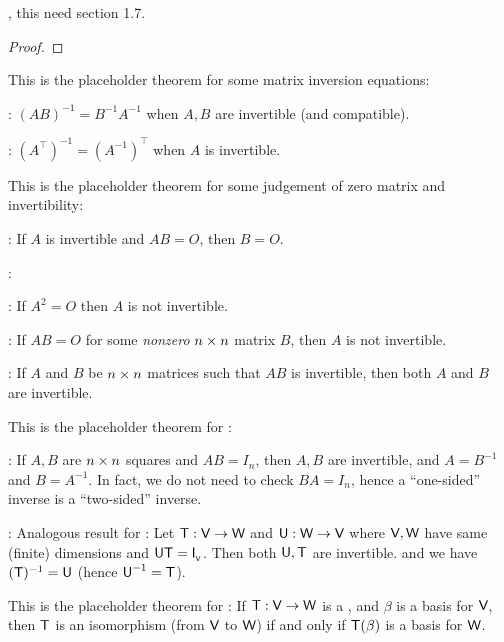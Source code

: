 \begin{exercise} \label{exercise 2.4.25}
\TODOREF{} , this need section 1.7.
\end{exercise}

\begin{proof}
\end{proof}

\begin{additional theorem} \label{athm 2.36}
This is the placeholder theorem for some matrix inversion equations:

 : \((AB)^{-1} = B^{-1} A^{-1}\) when \(A, B\) are invertible (and compatible).

 : \((A^\top)^{-1} = (A^{-1})^\top\) when \(A\) is invertible.
\end{additional theorem}

\begin{additional theorem} \label{athm 2.37}
This is the placeholder theorem for some judgement of zero matrix and invertibility:

 : If \(A\) is invertible and \(AB = O\), then \(B = O\).

:

: If \(A^2 = O\) then \(A\) is not invertible.

: If \(AB = O\) for some \emph{nonzero} \(n \times n\) matrix \(B\), then \(A\) is not invertible.

 : If \(A\) and \(B\) be \(n \times n\) matrices such that \(AB\) is invertible, then both \(A\) and \(B\) are invertible.
\end{additional theorem}

\begin{additional theorem} \label{athm 2.38}
This is the placeholder theorem for :

: If \(A, B\) are \(n \times n\) squares and \(AB = I_n\), then \(A, B\) are invertible, and \(A = B^{-1}\) and \(B = A^{-1}\).
In fact, we do not need to check \(BA = I_n\), hence a ``one-sided'' inverse is a ``two-sided'' inverse.

: Analogous result for \LTRAN{}:
Let \(\textsf{T} : \textsf{V} \to \textsf{W}\) and \(\textsf{U} : \textsf{W} \to \textsf{V}\) where \(\textsf{V}, \textsf{W}\) have same (finite) dimensions and \(\textsf{U}\textsf{T} = \textsf{I}_{_{\textsf{V}}}\).
Then both \(\textsf{U}, \textsf{T}\) are invertible. and we have \((\textsf{T})^{-1} = \textsf{U}\) (hence \(\textsf{U}^{-1} = \textsf{T}\)).
\end{additional theorem}

\begin{additional theorem} \label{athm 2.39}
This is the placeholder theorem for :
If \(\textsf{T} : \textsf{V} \to \textsf{W}\) is a \LTRAN{}, and \(\beta\) is a basis for \(\textsf{V}\), then \(\textsf{T}\) is an isomorphism (from \(\textsf{V}\) to \(\textsf{W}\)) if and only if \(\textsf{T}(\beta)\) is a basis for \(\textsf{W}\).
\end{additional theorem}

